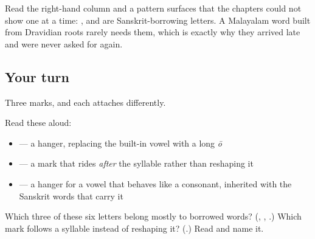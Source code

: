 Read the right-hand column and a pattern surfaces that the chapters could not show one at a time: \textbf{}, \textbf{} and \textbf{} are Sanskrit-borrowing letters. A Malayalam word built from Dravidian roots rarely needs them, which is exactly why they arrived late and were never asked for again.

\subsection*{Your turn}
Three marks, and each attaches differently.

Read these aloud:

\begin{itemize}
\raggedright
  \item \textbf{} — a hanger, replacing the built-in vowel with a long \emph{ō}
  \item \textbf{} — a mark that rides \emph{after} the syllable rather than reshaping it
  \item \textbf{} — a hanger for a vowel that behaves like a consonant, inherited with the Sanskrit words that carry it
\end{itemize}

\begin{tcolorbox}[breakable,colback=teal!4,colframe=teal!35!black,title={Before you move on}]
Which three of these six letters belong mostly to borrowed words? (\textbf{}, \textbf{}, \textbf{}.) Which mark follows a syllable instead of reshaping it? (\textbf{}.) Read \textbf{} and name it.
\end{tcolorbox}
